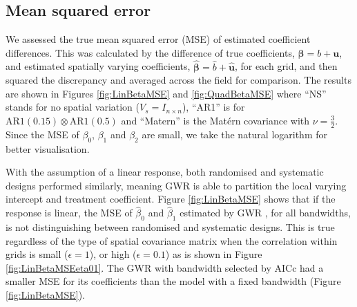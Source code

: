\documentclass[a4paper]{article} 	%
\newcommand{\Matern}{Mat\'ern }
\newcommand{\AR}{\mathrm{AR1}}
\begin{document}

\subsection{Mean squared error}\label{Sec:MSE}

We assessed the true mean squared error (MSE) of estimated coefficient differences. This was calculated by the difference of true coefficients, $\bm{\beta} = b + \bm{u}$, and estimated spatially varying coefficients, $\bm{\hat{\beta}} = \hat{b}+\bm{\hat{u}}$, for each grid, and then squared the discrepancy and averaged across the field for comparison. The results are shown in Figures \ref{fig:LinBetaMSE} and \ref{fig:QuadBetaMSE} where ``NS'' stands for no spatial variation ($V_s=I_{n\times n}$), ``AR1'' is for $\AR(0.15)\otimes \AR(0.5)$ and ``Matern'' is the \Matern covariance with $\nu=\frac{3}{2}$. Since the MSE of $\beta_0$, $\beta_1$ and $\beta_2$ are small, we take the natural logarithm for better visualisation. 

With the assumption of a linear response, both randomised and systematic designs performed similarly, meaning GWR is able to partition the local varying intercept and treatment coefficient. Figure \ref{fig:LinBetaMSE} shows that if the response is linear, the MSE of $\hat{\beta}_0$ and $\hat{\beta}_1$ estimated by GWR
, for all bandwidths,
is not distinguishing between randomised and systematic designs. This is true regardless of the type of spatial covariance matrix when the correlation within grids is small ($\epsilon=1$), or high ($\epsilon=0.1$) as is shown in Figure \ref{fig:LinBetaMSEeta01}. The GWR with bandwidth selected by AICc had a smaller MSE for its coefficients than the model with a fixed bandwidth (Figure \ref{fig:LinBetaMSE}). 
\end{document}
